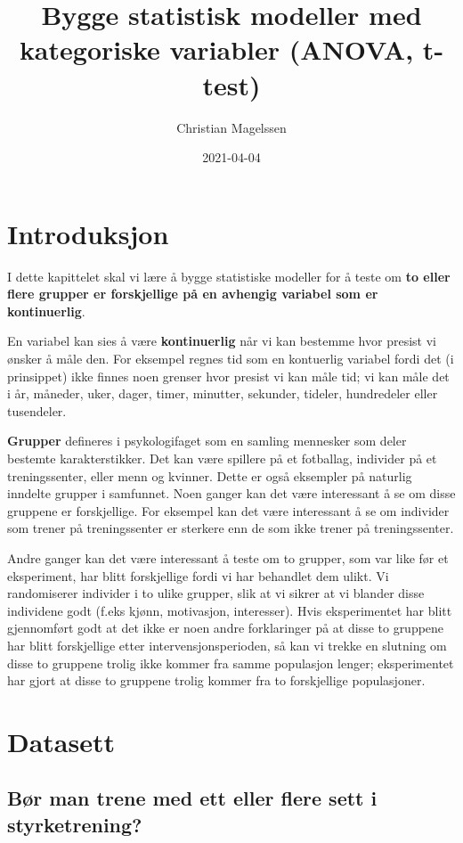 \documentclass[
]{book}
\title{Bygge statistisk modeller med kategoriske variabler (ANOVA, t-test)}
\author{Christian Magelssen}
\date{2021-04-04}
\begin{document}
\maketitle

{
\setcounter{tocdepth}{1}
\tableofcontents
}
\hypertarget{intro}{%
\chapter{Introduksjon}\label{intro}}

I dette kapittelet skal vi lære å bygge statistiske modeller for å teste om \textbf{to eller flere grupper er forskjellige på en avhengig variabel som er kontinuerlig}.

En variabel kan sies å være \textbf{kontinuerlig} når vi kan bestemme hvor presist vi ønsker å måle den. For eksempel regnes tid som en kontuerlig variabel fordi det (i prinsippet) ikke finnes noen grenser hvor presist vi kan måle tid; vi kan måle det i år, måneder, uker, dager, timer, minutter, sekunder, tideler, hundredeler eller tusendeler.

\textbf{Grupper} defineres i psykologifaget som en samling mennesker som deler bestemte karakterstikker. Det kan være spillere på et fotballag, individer på et treningssenter, eller menn og kvinner. Dette er også eksempler på naturlig inndelte grupper i samfunnet. Noen ganger kan det være interessant å se om disse gruppene er forskjellige. For eksempel kan det være interessant å se om individer som trener på treningssenter er sterkere enn de som ikke trener på treningssenter.

Andre ganger kan det være interessant å teste om to grupper, som var like før et eksperiment, har blitt forskjellige fordi vi har behandlet dem ulikt. Vi randomiserer individer i to ulike grupper, slik at vi sikrer at vi blander disse individene godt (f.eks kjønn, motivasjon, interesser). Hvis eksperimentet har blitt gjennomført godt at det ikke er noen andre forklaringer på at disse to gruppene har blitt forskjellige etter intervensjonsperioden, så kan vi trekke en slutning om disse to gruppene trolig ikke kommer fra samme populasjon lenger; eksperimentet har gjort at disse to gruppene trolig kommer fra to forskjellige populasjoner.

\hypertarget{datasett}{%
\chapter{Datasett}\label{datasett}}

\hypertarget{buxf8r-man-trene-med-ett-eller-flere-sett-i-styrketrening}{%
\section{Bør man trene med ett eller flere sett i styrketrening?}\label{buxf8r-man-trene-med-ett-eller-flere-sett-i-styrketrening}}
\end{document}
